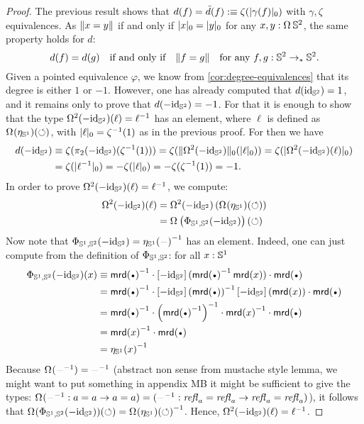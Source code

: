 \documentclass[english,a4]{article}
\renewcommand{\ap}[1]{\left[{#1}\right]}
\newcommand{\ptdto}{\to_\ast}%
\newcommand{\setTrunc}[1]{\Trunc{#1}_0}
\newcommand{\settrunc}[1]{\trunc{#1}_0}
\begin{document}
\begin{proof}
  The previous result shows that 
  $d(f) = \bar d(f) \defeq \zeta(\settrunc{\gamma(f)})$ 
  with $\gamma, \zeta$ equivalences. As
  $\lVert x = y\rVert$ if and only if $\settrunc x = \settrunc y$ for any
  $x,y:\loopspace\null \Sp$, the same property holds for $d$:
  \begin{displaymath}
    d(f) = d(g) \quad \text{if and only if}\quad
    \Trunc{f = g} \quad \text{for any}\ f,g:\Sp \ptdto\Sp.
  \end{displaymath}
  Given a pointed equivalence $\varphi$, we know from
  \cref{cor:degree-equivalences} that its degree is either $1$ or $-1$.
  However, one has already computed that $d(\mathord{\mathrm{id}}_{{\mathbb S^{2}}}) = 1$, and it remains only
  to prove that $d(-\mathord{\mathrm{id}}_{{\mathbb S^{2}}}) = -1$. For that it is enough to show that the type
  $\mathop{\Omega^{2}} (-\mathord{\mathrm{id}}_{{\mathbb S^{2}}})(\ell) = {\ell}^{-1}$ has an element, 
  where $\ell$ is defined as $\loopspace\null(\eta_\Sc)(\Sloop)$, 
  with $\settrunc \ell = \inv\zeta(1)$ as in the previous proof. 
  For then we have
  \begin{align*}
    d(-\id_\Sp) &\jdeq \zeta(\pi_2(-\id_\Sp)(\inv\zeta(1)))
                 = \zeta(\setTrunc{\loopspace 2 (-\id_\Sp)}(\settrunc{\ell}))
                 = \zeta(\settrunc{\loopspace 2 (-\id_\Sp)(\ell)})\\
                & = \zeta( \settrunc{\inv\ell}) = - \zeta( \settrunc{\ell})
                 = - \zeta(\inv\zeta(1)) = -1.
  \end{align*}
  In order to prove $\mathop{\Omega^{2}} (-\mathord{\mathrm{id}}_{{\mathbb S^{2}}})(\ell) = {\ell}^{-1}$, we compute:
  \begin{align*}
    \loopspace 2 (-\id_\Sp)(\ell) &= \loopspace 2 (-\id_\Sp) \left( \loopspace\null(\eta_\Sc)(\Sloop) \right)
    \\
    &= \loopspace\null \left( \Phi_{\Sc,\Sp}(-\id_\Sp) \right)(\Sloop)
  \end{align*}
  Now note that $\Phi_{\Sc,\Sp}(-\id_\Sp) = \inv{\eta_\Sc(\blank)}$ has an
  element. Indeed, one can just compute from the definition of
  $\Phi_{{{\mathbb S^{1}}},{{\mathbb S^{2}}}}$: for all $x:{{\mathbb S^{1}}}$
  \begin{align*}
    \Phi_{\Sc,\Sp}(-\id_\Sp)(x) 
    &\jdeq \inv{\mrd(\base)} \cdot \ap{-\id_\Sp}(\inv{\mrd(\base)} \mrd(x)) \cdot \mrd(\base)\\
    &= \inv{\mrd(\base)} \cdot \inv{\ap{-\id_\Sp}(\mrd(\base))} \ap{-\id_\Sp}(\mrd(x)) \cdot \mrd(\base)\\
    &= \inv{\mrd(\base)} \cdot \inv{\left(\inv{\mrd(\base)}\right)} \cdot \inv{\mrd(x)} \cdot \mrd(\base)\\
    &= \inv{\mrd(x)} \cdot \mrd(\base)\\
    &= \inv{\eta_\Sc(x)}
  \end{align*}
  Because $\loopspace\null(\inv\blank) = \inv\blank$ ({\color{red}abstract non
      sense from mustache style lemma, we might want to put something in
  appendix MB it might be sufficient to give the types:
$\loopspace\null(\inv\blank:a=a \to a=a) = 
                (\inv\blank: \refl{a}=\refl{a} \to \refl{a}=\refl{a})$}), 
it follows that
  $\loopspace\null(\Phi_{\Sc,\Sp}(-\id_\Sp))(\Sloop) =
  \inv{\loopspace\null(\eta_\Sc)(\Sloop)}$. Hence, $\mathop{\Omega^{2}}
  (-\mathord{\mathrm{id}}_{{\mathbb S^{2}}})(\ell) = {\ell}^{-1}$.
\end{proof}
\end{document}
